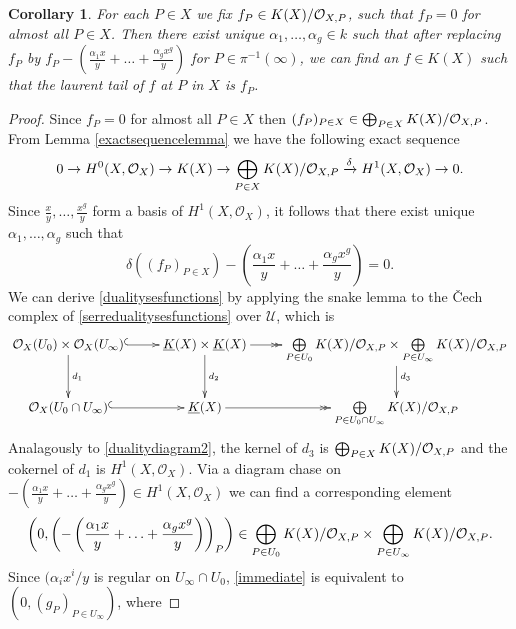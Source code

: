 \documentclass[11pt]{article} %
\theoremstyle{plain}
\newtheorem{cor}[defn]{Corollary}
\theoremstyle{remark}
\newcommand{\cO}{{\cal O}}
\newcommand{\ra}{\rightarrow}
\newcommand{\cU}{{\mathcal U}}
\newcommand{\cech}{\v{C}ech }
\newcommand{\hone}{H^1(X,\mathcal{O}_X)}
\begin{document}

\begin{cor}
For each $P \in X$ we fix $f_P \in K(X)/\cO_{X,P}$, such that $f_P = 0$ for almost all $P \in X$.
Then there exist unique $\alpha_1, \ldots, \alpha_g \in k$ such that after replacing $f_P$ by $f_P - \left( \frac{\alpha_1 x}{y} + \ldots + \frac{\alpha_g x^g}{y}\right)$ for $P \in \pi^{-1}(\infty)$, we can find an $f \in K(X)$ such that the laurent tail of $f$ at $P$ in $X$ is $f_P$.
\end{cor}
\begin{proof}
Since $f_P = 0$ for almost all $P \in X$ then $(f_P)_{P \in X} \in \bigoplus_{P \in X} K(X)/\cO_{X,P}$.
From Lemma \ref{exactsequencelemma} we have the following exact sequence
\begin{equation*}
0 \ra H^0(X,\cO_X) \ra K(X) \ra \bigoplus_{P \in X} K(X)/\cO_{X,P} \xrightarrow{\delta} \hone \ra 0.
\end{equation*}
Since $\frac{x}{y}, \ldots, \frac{x^g}{y}$ form a basis of $\hone$, it follows that there exist unique $\alpha_1, \ldots, \alpha_g$ such that
\[
\delta\left( (f_P)_{P \in X} \right) - \left( \frac{\alpha_1 x}{y} + \ldots + \frac{\alpha_g x^g}{y}\right) = 0.
\]
We can derive \eqref{dualitysesfunctions} by applying the snake lemma to the \cech complex of \eqref{serredualitysesfunctions} over $\cU$, which is
\begin{equation}\label{dualitydiagram2}
\xymatrix{\cO_X(U_0)\times\cO_X(U_\infty) \ar@{^{(}->}[r] \ar[d]^{d_1} & \underline{K}(X) \times \underline{K}(X) \ar[d]^{d_2} \ar@{->>}[r] & \bigoplus \limits_{P \in U_0} K(X)/\cO_{X,P} \times \bigoplus \limits_{P \in U_\infty} K(X)/\cO_{X,P} \ar[d]^{d_3} \\
\cO_X(U_0 \cap U_\infty) \ar@{^{(}->}[r]  & \underline{K}(X) \ar@{->>}[r] & \bigoplus \limits_{P\in U_0 \cap U_\infty} K(X)/\cO_{X,P} }
\end{equation}
Analagously to \eqref{dualitydiagram2}, the kernel of $d_3$ is $\bigoplus_{P \in X}K(X)/\cO_{X,P}$ and the cokernel of $d_1$ is $\hone$.
Via a diagram chase on $- \left( \frac{\alpha_1 x}{y} + \ldots + \frac{\alpha_g x^g}{y}\right) \in \hone$ we can find a corresponding element 
\begin{equation}\label{immediate}
\left(0, \left(- \left( \frac{\alpha_1 x}{y} + \ldots + \frac{\alpha_g x^g}{y}\right) \right)_P\right) \in \bigoplus_{P \in U_0}K(X)/\cO_{X,P} \times \bigoplus_{P \in U_\infty}K(X)/\cO_{X,P}.
\end{equation}
Since $(\alpha_ix^i/y$ is regular on $U_\infty \cap U_0$, \eqref{immediate} is equivalent to $\left(0, (g_P)_{P \in U_\infty}\right)$, where

\end{proof}
\end{document}
